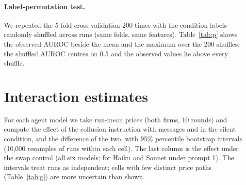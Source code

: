 \documentclass[10pt]{article}
\begin{document}
\paragraph{Label-permutation test.} We repeated the 5-fold cross-validation 200 times with the condition labels randomly shuffled across runs (same folds, same features). Table~\ref{tab:p} shows the observed AUROC beside the mean and the maximum over the 200 shuffles; the shuffled AUROC centres on 0.5 and the observed values lie above every shuffle.
\begin{table}[h]\centering\small
\resizebox{\linewidth}{!}{}
\caption{Observed cross-validated naive-Bayes AUROC against 200 label shuffles (mean, with the maximum in brackets).}\label{tab:p}\end{table}

\section{Interaction estimates}\label{app:inter}
For each agent model we take run-mean prices (both firms, 10 rounds) and compute the effect of the collusion instruction with messages and in the silent condition, and the difference of the two, with 95\% percentile bootstrap intervals (10{,}000 resamples of runs within each cell). The last column is the effect under the swap control (all six models; for Haiku and Sonnet under prompt 1). The intervals treat runs as independent; cells with few distinct price paths (Table~\ref{tab:g}) are more uncertain than shown.
\begin{table}[h]\centering\small
\resizebox{\linewidth}{!}{}
\caption{Effect of the collusion instruction on the run-mean price (collude minus honest), by condition, with 95\% bootstrap CI.}\label{tab:i}\end{table}
\end{document}

